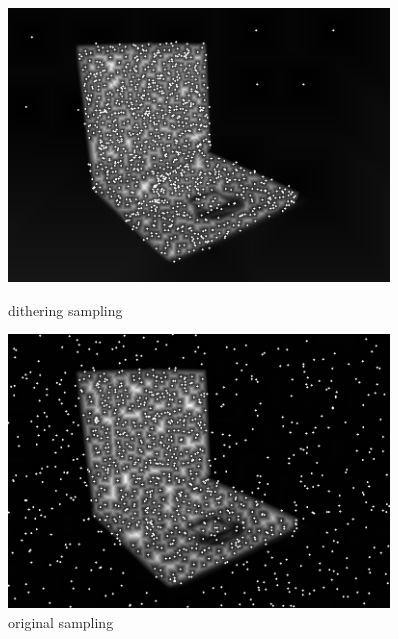 \documentclass[11pt]{article}
\begin{document}
\begin{figure}[htbp]
\centering
\begin{minipage}[t]{0.48\textwidth}
\centering
\includegraphics[width = 0.9\textwidth]{new_sam.png}
\caption{dithering sampling}
\end{minipage}
\begin{minipage}[t]{0.48\textwidth}
\centering
\includegraphics[width = 0.9\textwidth]{old_sam.png}
\caption{original sampling}
\end{minipage}
\end{figure}
\end{document}
